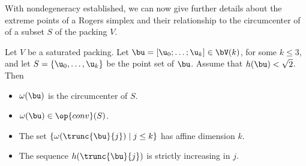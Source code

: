 With nondegeneracy established, we can now give further details about
the extreme points of a Rogers simplex and their relationship to the
circumcenter of of a subset $S$ of the packing $V$.

\begin{lemma}\label{lemma:v2} 
Let $V$ be a saturated packing.
Let $\bu=[\u_0;\ldots;\u_k]\in \bV(k)$, for some $k\le 3$,
and let $S=\{\u_0,\ldots,\u_k\}$ be the
point set of $\bu$.
Assume that $h(\bu)<\sqrt2$.
Then 
\begin{itemize} 
\item%
$\omega(\bu)$ is the circumcenter of $S$.
\item%
$\omega(\bu)\in\op{conv}(S)$.
\item%
The set $\{\omega(\trunc{\bu}{j})\mid j\le k\}$ has affine dimension $k$.
\item
The sequence $h(\trunc{\bu}{j})$ is
strictly increasing in $j$.
\end{itemize}
\end{lemma}
%

